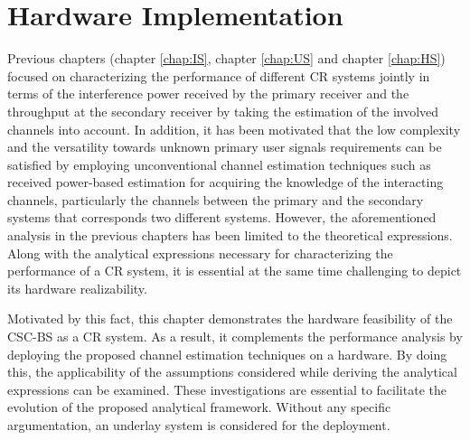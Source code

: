 \chapter{Hardware Implementation}
\label{chap:Field}

Previous chapters (chapter \ref{chap:IS}, chapter \ref{chap:US} and chapter \ref{chap:HS}) focused on characterizing the performance of different CR systems jointly in terms of the interference power received by the primary receiver and the throughput at the secondary receiver by taking the estimation of the involved channels into account. In addition, it has been motivated that the low complexity and the versatility towards unknown primary user signals requirements can be satisfied by employing unconventional channel estimation techniques such as received power-based estimation for acquiring the knowledge of the interacting channels, particularly the channels between the primary and the secondary systems that corresponds two different systems. However, the aforementioned analysis in the previous chapters has been limited to the theoretical expressions. Along with the analytical expressions necessary for characterizing the performance of a CR system, it is essential at the same time challenging to depict its hardware realizability. 

Motivated by this fact, this chapter demonstrates the hardware feasibility of the CSC-BS as a CR system. As a result, it complements the performance analysis by deploying the proposed channel estimation techniques on a hardware. By doing this, the applicability of the assumptions considered while deriving the analytical expressions can be examined. These investigations are essential to facilitate the evolution of the proposed analytical framework. Without any specific argumentation, an underlay system is considered for the deployment.    

